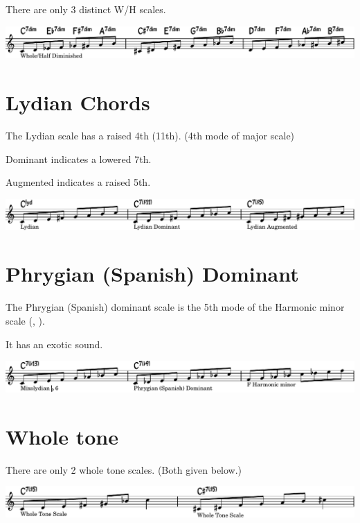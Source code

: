 \documentclass[11pt]{article}
\begin{document}
There are only 3 distinct W/H scales.

\begin{center}
\includegraphics[width=.98\linewidth]{whole-half-dim-3.pdf}
\end{center}

\section{Lydian Chords}
\label{sec:orgd6df5f5}
The Lydian scale has a raised 4th (11th). (4th mode of major scale)

Dominant indicates a lowered 7th.

Augmented indicates a raised 5th.
\begin{center}
\includegraphics[width=.98\linewidth]{lydian.pdf}
\end{center}

\section{Phrygian (Spanish) Dominant}
\label{sec:org578086f}

The Phrygian (Spanish) dominant scale is the 5th mode of the Harmonic minor scale (, ).

It has an exotic sound.
\begin{center}
\includegraphics[width=.98\linewidth]{phrygian.pdf}
\end{center}

\section{Whole tone}
\label{sec:org0f918f8}

There are only 2 whole tone scales. (Both given below.)
\begin{center}
\includegraphics[width=.98\linewidth]{whole-tone.pdf}
\end{center}
\end{document}

